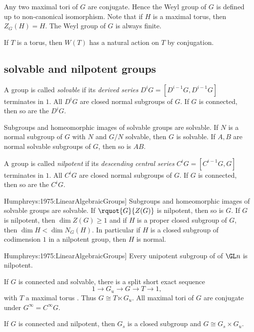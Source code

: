\documentclass[english, no-theorem-numbers]{short-notes}
\newcommand\Humph[1]{\cite[#1]{Humphreys:1975:LinearAlgebraicGroups}}
\begin{document}
Any two maximal tori of $G$ are conjugate.
Hence the Weyl group of $G$ is defined up to non-canonical isomorphism.
Note that if $H$ is a maximal torus, then $Z_G(H) = H$.
The Weyl group of $G$ is always finite.

If $T$ is a torus, then $W(T)$ has a natural action on $T$ by conjugation.

\subsection*{solvable and nilpotent groups}

A group is called \emph{solvable} if its \emph{derived series} $D^{i}G = [D^{i-1}G,D^{i-1}G]$ terminates in $1$.
All $D^iG$ are closed normal subgroups of $G$. 
If $G$ is connected, then so are the $D^iG$.

\begin{Lem}
    Subgroups and homeomorphic images of solvable groups are solvable.
    If $N$ is a normal subgroup of $G$ with $N$ and $G/N$ solvable, then $G$ is solvable.
    If $A, B$ are normal solvable subgroups of $G$, then so is $AB$.
\end{Lem}

A group is called \emph{nilpotent} if its \emph{descending central series} $C^{i}G = [C^{i-1}G,G]$ terminates in $1$.
All $C^iG$ are closed normal subgroups of $G$. 
If $G$ is connected, then so are the $C^iG$.

\begin{Lem}[\Humph{Prop.~17.4}]
    Subgroups and homeomorphic images of solvable groups are solvable.
    If $\rquot{G}{Z(G)}$ is nilpotent, then so is $G$.
    If $G$ is nilpotent, then $\dim Z(G) \ge 1$ and if $H$ is a proper closed subgroup of $G$, then $\dim H < \dim N_G(H)$.
    In particular if $H$ is a closed subgroup of codimension $1$ in a nilpotent group, then $H$ is normal.
\end{Lem}

\begin{Thm}[\Humph{Cor.~17.5}]
    Every unipotent subgroup of of $\GL n$ is nilpotent.
\end{Thm}

If $G$ is connected and solvable, there is a split short exact sequence 
\[
    1 → G_u → G → T → 1,
\]
with $T$ a maximal torus \Humph{Thm.~19.3}. 
Thus $G \cong T ⋉ G_u$.
All maximal tori of $G$ are conjugate under $G^∞ = C^∞G$.

If $G$ is connected and nilpotent, then $G_s$ is a closed subgroup and $G \cong G_s × G_u$.
\end{document}
